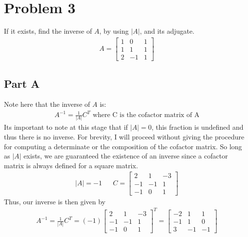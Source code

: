 \documentclass{article}
\begin{document}
\section*{Problem 3}
If it exists, find the inverse of $A$, by using $|A|$, and its adjugate.
\begin{align*}
A = \begin{bmatrix}
1 & 0 & 1\\
1 & 1 & 1\\
2 & -1 & 1
\end{bmatrix}
\end{align*}
\subsection*{Part A}
Note here that the inverse of $A$ is:
\begin{align*}
A^{-1} = \frac{1}{|A|} C^T \text{ where C is the cofactor matrix of A} 
\end{align*}
Its important to note at this stage that if $|A| = 0$, this fraction is undefined and thus there is no inverse. For brevity, I will proceed without giving the procedure for computing a determinate or the composition of the cofactor matrix. So long as $|A|$ exists, we are guaranteed the existence of an inverse since a cofactor matrix is always defined for a square matrix.
\begin{align*}
|A| = -1 && C = \begin{bmatrix}
2 & 1 & -3\\
-1 & -1 & 1\\
-1 & 0 & 1
\end{bmatrix}
\end{align*}
Thus, our inverse is then given by
\begin{align*}
\boxed{A^{-1} = \frac{1}{|A|} C^T = (-1) \begin{bmatrix}
2 & 1 & -3\\
-1 & -1 & 1\\
-1 & 0 & 1
\end{bmatrix}^T = \begin{bmatrix}
-2 & 1 & 1\\
-1 & 1 & 0\\
3 & -1 & -1
\end{bmatrix}}
\end{align*}
\end{document}
